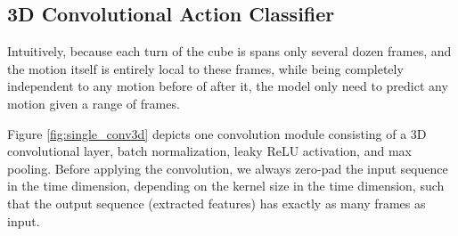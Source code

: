 \documentclass[10pt,twocolumn,letterpaper]{article}
\begin{document}
\subsection{3D Convolutional Action Classifier}

Intuitively, because each turn of the cube is spans only several dozen frames, and the motion itself is entirely local to these frames, while being completely independent to any motion before of after it, the model only need to predict any motion given a range of frames. 


Figure \ref{fig:single_conv3d} depicts one convolution module consisting of a 3D convolutional layer, batch normalization, leaky ReLU activation, and max pooling. Before applying the convolution, we always zero-pad the input sequence in the time dimension, depending on the kernel size in the time dimension, such that the output sequence (extracted features) has exactly as many frames as input. 
\end{document}
